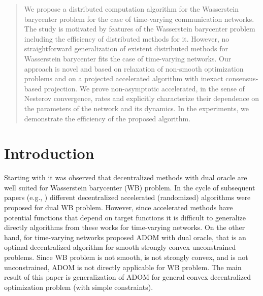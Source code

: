 \begin{abstract}
We propose a distributed computation algorithm for the Wasserstein barycenter problem for the case of time-varying communication networks. The study is motivated by features of the Wasserstein barycenter problem including the efficiency of distributed methods for it. However, no straightforward generalization of existent distributed methods for Wasserstein barycenter fits the case of time-varying networks. Our approach is novel and based on relaxation of non-smooth optimization problems and on a projected accelerated algorithm with inexact consensus-based projection. We prove non-asymptotic accelerated, in the sense of Nesterov convergence, rates and explicitly characterize their dependence on the parameters of the network and its dynamics. In the experiments, we demonstrate the efficiency of the proposed algorithm.
\end{abstract}

\section*{Introduction}

Starting with \cite{uribe2018distributed} it was observed that decentralized methods with dual oracle are well suited for Wasserstein barycenter (WB) problem. In the cycle of subsequent papers (e.g., \cite{dvurechenskii2018decentralize,kroshnin2019complexity,dvinskikh2020improved,rogozin2021decentralized}) different decentralized accelerated (randomized) algorithms were proposed for dual WB problem. However, since accelerated methods have potential functions that depend on target functions it is difficult to generalize directly algorithms from these works for time-varying networks. On the other hand, for time-varying networks \cite{kovalev2021adom} proposed ADOM with dual oracle, that is an optimal decentralized algorithm for smooth strongly convex unconstrained problems.
Since WB problem
is not smooth, is not strongly convex, and is not unconstrained, 
 ADOM is not directly applicable for WB problem. 
The main result of this paper is generalization of ADOM for general convex decentralized optimization problem (with simple constraints).


